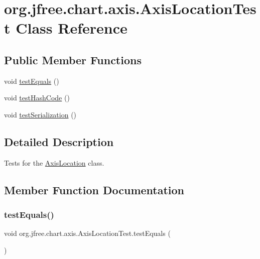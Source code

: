 \hypertarget{classorg_1_1jfree_1_1chart_1_1axis_1_1_axis_location_test}{}\section{org.\+jfree.\+chart.\+axis.\+Axis\+Location\+Test Class Reference}
\label{classorg_1_1jfree_1_1chart_1_1axis_1_1_axis_location_test}
\subsection*{Public Member Functions}
\begin{DoxyCompactItemize}
\item 
void \mbox{\hyperlink{classorg_1_1jfree_1_1chart_1_1axis_1_1_axis_location_test_ac6d6ca90f1664a4783be51c4c1c64bc9}{test\+Equals}} ()
\item 
void \mbox{\hyperlink{classorg_1_1jfree_1_1chart_1_1axis_1_1_axis_location_test_ad7994555f702234da932f867aeac32d3}{test\+Hash\+Code}} ()
\item 
void \mbox{\hyperlink{classorg_1_1jfree_1_1chart_1_1axis_1_1_axis_location_test_a1398815172f9ed04f967a2789d63f84b}{test\+Serialization}} ()
\end{DoxyCompactItemize}


\subsection{Detailed Description}
Tests for the \mbox{\hyperlink{classorg_1_1jfree_1_1chart_1_1axis_1_1_axis_location}{Axis\+Location}} class. 

\subsection{Member Function Documentation}
\mbox{\label{classorg_1_1jfree_1_1chart_1_1axis_1_1_axis_location_test_ac6d6ca90f1664a4783be51c4c1c64bc9}} 
\subsubsection{\texorpdfstring{test\+Equals()}{testEquals()}}
{\footnotesize\ttfamily void org.\+jfree.\+chart.\+axis.\+Axis\+Location\+Test.\+test\+Equals (\begin{DoxyParamCaption}{ }\end{DoxyParamCaption})}

